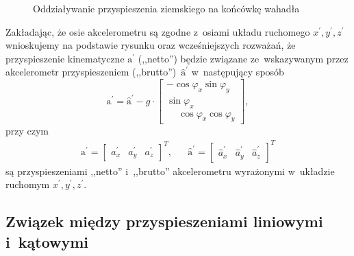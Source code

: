 \documentclass[paper=a4,DIV=12]{tmmlab}
\newcommand{\brm}[1]{\bm{\mathrm{#1}}}
\begin{document}
\begin{appendices}
\begin{figure}[htbp]
  \caption{Oddziaływanie przyspieszenia ziemskiego na końcówkę wahadła}
  \label{fig:AFKVE}
\end{figure}

Zakładając, że osie akcelerometru są zgodne z~osiami układu ruchomego
$x^{\prime},y^{\prime},z^{\prime}$ wnioskujemy na podstawie rysunku oraz
wcześniejszych rozważań, że przyspieszenie kinematyczne $\brm{a}^{\prime}$
(,,netto'') będzie związane ze~wskazywanym przez akcelerometr przyspieszeniem
(,,brutto'')~$\hat{\brm{a}}^{\prime}$ w~następujący sposób
\begin{equation}
  {\brm{a}^{\prime}} = \hat{\brm{a}}^{\prime}
  -
  g \cdot
  \begin{bmatrix}
              -\cos{\varphi_x} \sin{\varphi_y}  \\
                      \sin{\varphi_x}          \\
    \phantom{-}\cos{\varphi_x} \cos{\varphi_y}
  \end{bmatrix},
  \label{eq:EUIQU}
\end{equation}
przy czym
\begin{align}
  & \brm{a}^{\prime} = \begin{bmatrix}
    a_x^{\prime}  & a_y^{\prime}  & a_z^{\prime}
  \end{bmatrix}^T, &
  & \hat{\brm{a}}^{\prime}  = \begin{bmatrix}
    \hat{a}_x^{\prime}  & \hat{a}_y^{\prime}  & \hat{a}_z^{\prime}
  \end{bmatrix}^T &
  \label{eq:NL9I0}
\end{align}
są przyspieszeniami ,,netto'' i~,,brutto'' akcelerometru wyrażonymi w~układzie
ruchomym $x^{\prime},y^{\prime},z^{\prime}$.

\subsection{Związek między przyspieszeniami liniowymi i~kątowymi}
\label{sec:QTVP6}


\end{appendices}
\end{document}
